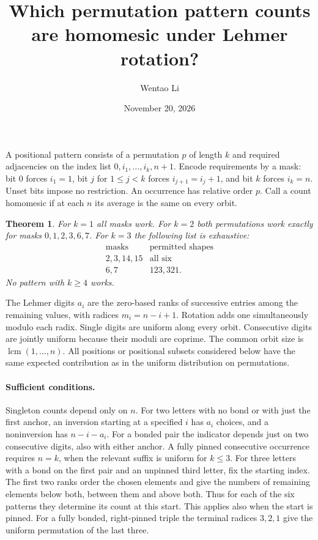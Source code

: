 \documentclass[11pt]{article}
\title{Which permutation pattern counts are homomesic under Lehmer rotation?}
\author{Wentao Li}
\date{November 20, 2026}
\newtheorem{theorem}{Theorem}
\begin{document}
\maketitle
A positional pattern consists of a permutation $p$ of length $k$ and required adjacencies on the index list $0,i_1,\ldots,i_k,n+1$. Encode requirements by a mask: bit 0 forces $i_1=1$, bit $j$ for $1\le j<k$ forces $i_{j+1}=i_j+1$, and bit $k$ forces $i_k=n$. Unset bits impose no restriction. An occurrence has relative order $p$. Call a count homomesic if at each $n$ its average is the same on every orbit.
\begin{theorem}For $k=1$ all masks work. For $k=2$ both permutations work exactly for masks $0,1,2,3,6,7$. For $k=3$ the following list is exhaustive:
\[
\begin{array}{cl}
\text{masks}&\text{permitted shapes}\\
2,3,14,15&\text{all six}\\
6,7&123,321 .
\end{array}
\]
No pattern with $k\ge4$ works.\end{theorem}
The Lehmer digits $a_i$ are the zero-based ranks of successive entries among the remaining values, with radices $m_i=n-i+1$. Rotation adds one simultaneously modulo each radix. Single digits are uniform along every orbit. Consecutive digits are jointly uniform because their moduli are coprime. The common orbit size is $\operatorname{lcm}(1,\dots,n)$. All positions or positional subsets considered below have the same expected contribution as in the uniform distribution on permutations.
\paragraph{Sufficient conditions.} Singleton counts depend only on $n$. For two letters with no bond or with just the first anchor, an inversion starting at a specified $i$ has $a_i$ choices, and a noninversion has $n-i-a_i$. For a bonded pair the indicator depends just on two consecutive digits, also with either anchor. A fully pinned consecutive occurrence requires $n=k$, when the relevant suffix is uniform for $k\le3$. For three letters with a bond on the first pair and an unpinned third letter, fix the starting index. The first two ranks order the chosen elements and give the numbers of remaining elements below both, between them and above both. Thus for each of the six patterns they determine its count at this start. This applies also when the start is pinned. For a fully bonded, right-pinned triple the terminal radices $3,2,1$ give the uniform permutation of the last three.
\end{document}
